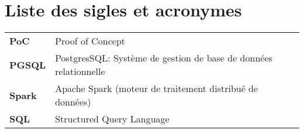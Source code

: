 \chapter*{Liste des sigles et acronymes}


\thispagestyle{plain}

\begin{tabular}{ll}
\textbf{PoC} & Proof of Concept \\
\textbf{PGSQL} & PostgresSQL: Système de gestion de base de données relationnelle \\
\textbf{Spark} & Apache Spark (moteur de traitement distribué de données) \\
\textbf{SQL} & Structured Query Language \\
\end{tabular}

\newpage
